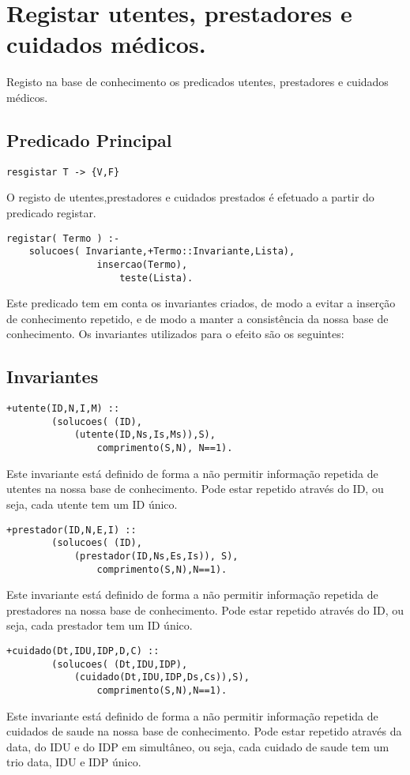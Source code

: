 \documentclass{report}
\def\titulo#1{\section{#1}}
\begin{document}
\titulo{Registar utentes, prestadores e cuidados médicos.}

Registo na base de conhecimento os predicados utentes, prestadores e cuidados médicos. 

\subsection{Predicado Principal}
 
\begin{verbatim}
resgistar T -> {V,F}
\end{verbatim}
 
O registo de utentes,prestadores e cuidados prestados é efetuado a partir do predicado registar. 
 

\begin{verbatim}
registar( Termo ) :-
    solucoes( Invariante,+Termo::Invariante,Lista), 
                insercao(Termo), 
                    teste(Lista).
\end{verbatim}
 
Este predicado tem em conta os invariantes criados, de modo a evitar a inserção de conhecimento repetido, e de modo a manter a consistência da nossa base de conhecimento. Os invariantes utilizados para o efeito são os seguintes:    

\subsection{Invariantes}

\begin{verbatim}
+utente(ID,N,I,M) :: 
        (solucoes( (ID), 
            (utente(ID,Ns,Is,Ms)),S), 
                comprimento(S,N), N==1).
\end{verbatim}
Este invariante está definido de forma a não permitir informação repetida de utentes na nossa base de conhecimento. Pode estar repetido através do ID, ou seja, cada utente tem um ID único.
\bigbreak

\begin{verbatim}
+prestador(ID,N,E,I) :: 
        (solucoes( (ID), 
            (prestador(ID,Ns,Es,Is)), S),
                comprimento(S,N),N==1).
\end{verbatim}
Este invariante está definido de forma a não permitir informação repetida de prestadores na nossa base de conhecimento. Pode estar repetido através do ID, ou seja, cada prestador tem um ID único.
\bigbreak

\begin{verbatim}
+cuidado(Dt,IDU,IDP,D,C) :: 
        (solucoes( (Dt,IDU,IDP),
            (cuidado(Dt,IDU,IDP,Ds,Cs)),S),
                comprimento(S,N),N==1).
\end{verbatim}
Este invariante está definido de forma a não permitir informação repetida de cuidados de saude na nossa base de conhecimento. Pode estar repetido através da data, do IDU e do IDP em simultâneo, ou seja, cada cuidado de saude tem um trio data, IDU e IDP único.
\bigbreak
\end{document}
